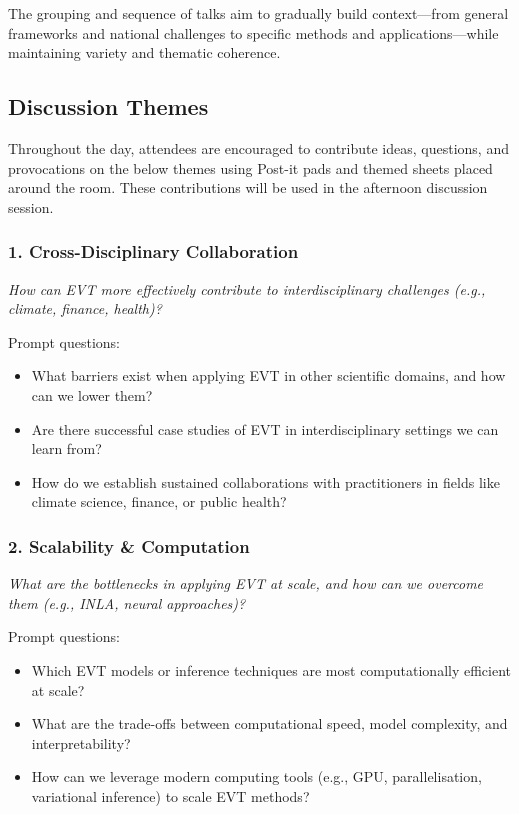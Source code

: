 \documentclass[
  11pt,
  letterpaper,
  DIV=11,
  numbers=noendperiod]{scrartcl}
\begin{document}
The grouping and sequence of talks aim to gradually build context---from
general frameworks and national challenges to specific methods and
applications---while maintaining variety and thematic coherence.

\newpage

\hypertarget{discussion-themes}{%
\subsection{Discussion Themes}\label{discussion-themes}}

Throughout the day, attendees are encouraged to contribute ideas,
questions, and provocations on the below themes using Post-it pads and
themed sheets placed around the room. These contributions will be used
in the afternoon discussion session.

\hypertarget{cross-disciplinary-collaboration}{%
\subsubsection{1. Cross-Disciplinary
Collaboration}\label{cross-disciplinary-collaboration}}

\emph{How can EVT more effectively contribute to interdisciplinary
challenges (e.g., climate, finance, health)?}

Prompt questions:

\begin{itemize}
\item
  What barriers exist when applying EVT in other scientific domains, and
  how can we lower them?
\item
  Are there successful case studies of EVT in interdisciplinary settings
  we can learn from?
\item
  How do we establish sustained collaborations with practitioners in
  fields like climate science, finance, or public health?
\end{itemize}

\hypertarget{scalability-computation}{%
\subsubsection{2. Scalability \&
Computation}\label{scalability-computation}}

\emph{What are the bottlenecks in applying EVT at scale, and how can we
overcome them (e.g., INLA, neural approaches)?}

Prompt questions:

\begin{itemize}
\item
  Which EVT models or inference techniques are most computationally
  efficient at scale?
\item
  What are the trade-offs between computational speed, model complexity,
  and interpretability?
\item
  How can we leverage modern computing tools (e.g., GPU,
  parallelisation, variational inference) to scale EVT methods?
\end{itemize}
\end{document}
